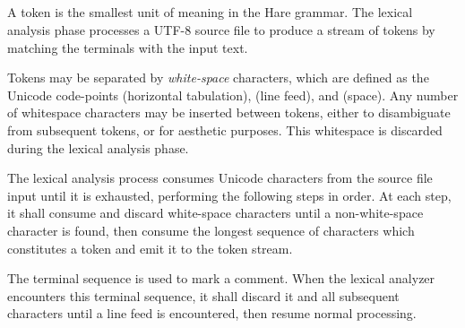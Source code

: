 
\begin{grammar}
\\
	 \\
	 \\
	 \\
\end{grammar}

\specsubitem
A token is the smallest unit of meaning in the Hare grammar. The lexical
analysis phase processes a \hbox{UTF-8} source file to produce a stream of
tokens by matching the terminals with the input text.

\specsubitem
Tokens may be separated by \textit{white-space} characters, which are defined as
the Unicode code-points  (horizontal tabulation), 
(line feed), and  (space). Any number of whitespace characters may
be inserted between tokens, either to disambiguate from subsequent tokens, or
for aesthetic purposes. This whitespace is discarded during the lexical
analysis phase.



\specsubitem
The lexical analysis process consumes Unicode characters from the source file
input until it is exhausted, performing the following steps in order. At each
step, it shall consume and discard white-space characters until a
non-white-space character is found, then consume the longest sequence of
characters which constitutes a token and emit it to the token stream.

\specsubitem
The terminal sequence \terminal{//} is used to mark a comment. When the lexical
analyzer encounters this terminal sequence, it shall discard it and all
subsequent characters until a line feed  is encountered, then
resume normal processing.
